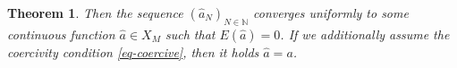 \documentclass[A4paper,11pt]{article}
\newtheorem{theorem}{Theorem}[section]
\theoremstyle{definition}
\newcommand{\N}{\mathbb{N}}
\newcommand{\R}{\mathbb{R}}
\DeclareMathOperator{\argmin}{arg\,min}
\begin{document}
\begin{theorem}
	Then the sequence $(\widehat a_{N})_{N \in \N}$ converges uniformly to some continuous function $\widehat a \in X_M$ such that
	$E(\widehat a)=0$. If we additionally assume the coercivity condition \eqref{eq-coercive}, then it holds
	$\widehat a=a$.
%	
%	
\end{theorem}
\end{document}
